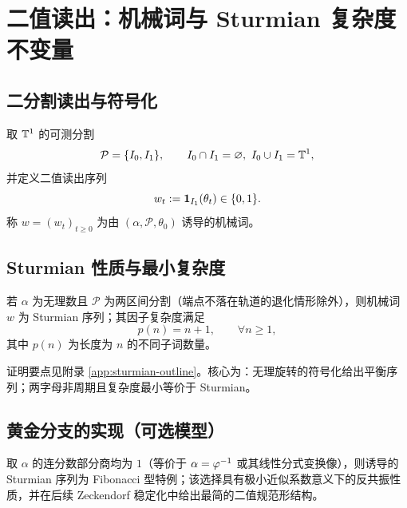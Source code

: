 \section{二值读出：机械词与 Sturmian 复杂度不变量}

\subsection{二分割读出与符号化}

\begin{definition}[二分割读出]\label{def:binary-partition-readout}
取 $\mathbb{T}^1$ 的可测分割
\[
\mathcal{P}=\{I_0,I_1\},\qquad I_0\cap I_1=\varnothing,\ I_0\cup I_1=\mathbb{T}^1,
\]
并定义二值读出序列
\[
w_t:=\mathbf{1}_{I_1}(\theta_t)\in\{0,1\}.
\]
称 $w=(w_t)_{t\ge 0}$ 为由 $(\alpha,\mathcal{P},\theta_0)$ 诱导的机械词。
\end{definition}

\subsection{Sturmian 性质与最小复杂度}

\begin{theorem}\label{thm:sturmian-min-complexity}
若 $\alpha$ 为无理数且 $\mathcal{P}$ 为两区间分割（端点不落在轨道的退化情形除外），则机械词 $w$ 为 Sturmian 序列；其因子复杂度满足
\[
p(n)=n+1,\qquad \forall n\ge 1,
\]
其中 $p(n)$ 为长度为 $n$ 的不同子词数量。
\end{theorem}

\begin{remark}
证明要点见附录 \ref{app:sturmian-outline}。核心为：无理旋转的符号化给出平衡序列；两字母非周期且复杂度最小等价于 Sturmian。
\end{remark}

\subsection{黄金分支的实现（可选模型）}

\begin{assumption}[黄金斜率选择]\label{assump:golden-slope}
取 $\alpha$ 的连分数部分商均为 $1$（等价于 $\alpha=\varphi^{-1}$ 或其线性分式变换像），则诱导的 Sturmian 序列为 Fibonacci 型特例；该选择具有极小近似系数意义下的反共振性质，并在后续 Zeckendorf 稳定化中给出最简的二值规范形结构。
\end{assumption}

